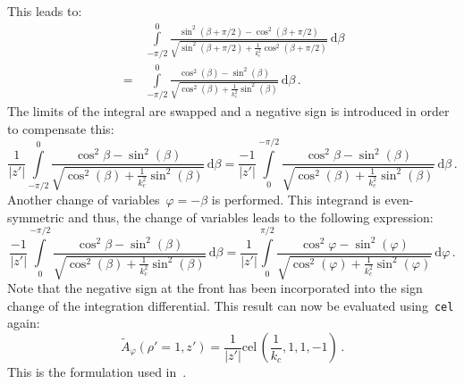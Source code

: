 This leads to:
\begin{align}
 ~  &\, \int\limits_{-\pi/2}^{0} \frac{\sin^2(\beta + \pi/2) - \cos^2(\beta + \pi/2)}{\sqrt{\sin^2(\beta + \pi/2) + \frac{1}{k_c^2} \cos^2(\beta + \pi/2)}} \,\mathrm{d}\beta \nonumber \\
 ~ =&\, \int\limits_{-\pi/2}^{0} \frac{\cos^2(\beta) - \sin^2(\beta)}{\sqrt{\cos^2(\beta ) + \frac{1}{k_c^2} \sin^2(\beta)}} \,\mathrm{d}\beta \, .
\end{align}
The limits of the integral are swapped and a negative sign is introduced in order to compensate this:
\begin{equation}
   \frac{1}{|z'|} \int\limits_{-\pi/2}^{0} \frac{\cos^2{\beta} - \sin^2(\beta)}{\sqrt{\cos^2(\beta ) + \frac{1}{k_c^2} \sin^2(\beta)}} \,\mathrm{d}\beta
 = \frac{-1}{|z'|} \int\limits_{0}^{-\pi/2} \frac{\cos^2{\beta} - \sin^2(\beta)}{\sqrt{\cos^2(\beta ) + \frac{1}{k_c^2} \sin^2(\beta)}} \,\mathrm{d}\beta \, .
\end{equation}
Another change of variables~$\varphi = -\beta$ is performed.
This integrand is even-symmetric and thus, the change of variables leads to
the following expression:
\begin{equation}
   \frac{-1}{|z'|} \int\limits_{0}^{-\pi/2} \frac{\cos^2{\beta} - \sin^2(\beta)}{\sqrt{\cos^2(\beta ) + \frac{1}{k_c^2} \sin^2(\beta)}} \,\mathrm{d}\beta
 = \frac{1}{|z'|} \int\limits_{0}^{\pi/2} \frac{\cos^2{\varphi} - \sin^2(\varphi)}{\sqrt{\cos^2(\varphi) + \frac{1}{k_c^2} \sin^2(\varphi)}} \,\mathrm{d}\varphi \, .
\end{equation}
Note that the negative sign at the front has been incorporated into the sign change of the integration differential.
This result can now be evaluated using~\texttt{cel} again:
\begin{equation}
  \tilde{A}_\varphi(\rho'=1,z') = \frac{1}{|z'|} \textrm{cel}\,\left(\frac{1}{k_c}, 1, 1, -1\right) \, .
\end{equation}
This is the formulation used in~.

